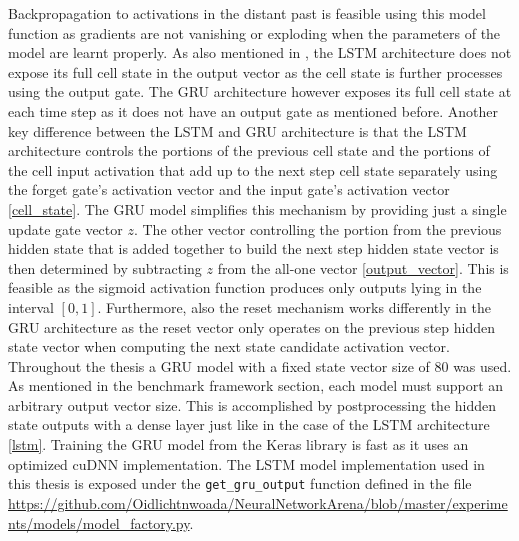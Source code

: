 \documentclass[draft,final]{vutinfth} %
\begin{document}
    Backpropagation to activations in the distant past is feasible using this model function as gradients are not vanishing or exploding when the parameters of the model are learnt properly.
    As also mentioned in \cite[p. 5]{GRU}, the LSTM architecture does not expose its full cell state in the output vector as the cell state is further processes using the output gate.
    The GRU architecture however exposes its full cell state at each time step as it does not have an output gate as mentioned before.
    Another key difference between the LSTM and GRU architecture is that the LSTM architecture controls the portions of the previous cell state and the portions of the cell input activation that add up to the next step cell state separately using the forget gate's activation vector and the input gate's activation vector \ref{cell_state}.
    The GRU model simplifies this mechanism by providing just a single update gate vector $z$.
    The other vector controlling the portion from the previous hidden state that is added together to build the next step hidden state vector is then determined by subtracting $z$ from the all-one vector \ref{output_vector}.
    This is feasible as the sigmoid activation function produces only outputs lying in the interval $[0,1]$. 
    Furthermore, also the reset mechanism works differently in the GRU architecture as the reset vector only operates on the previous step hidden state vector when computing the next state candidate activation vector.
    Throughout the thesis a GRU model with a fixed state vector size of $80$ was used. As mentioned in the benchmark framework section, each model must support an arbitrary output vector size.
    This is accomplished by postprocessing the hidden state outputs with a dense layer just like in the case of the LSTM architecture \ref{lstm}.
    Training the GRU model from the Keras library is fast as it uses an optimized cuDNN \cite{cuDNN} implementation.
    The LSTM model implementation used in this thesis is exposed under the \texttt{get\_gru\_output} function defined in the file \url{https://github.com/Oidlichtnwoada/NeuralNetworkArena/blob/master/experiments/models/model_factory.py}.
 
\end{document}
